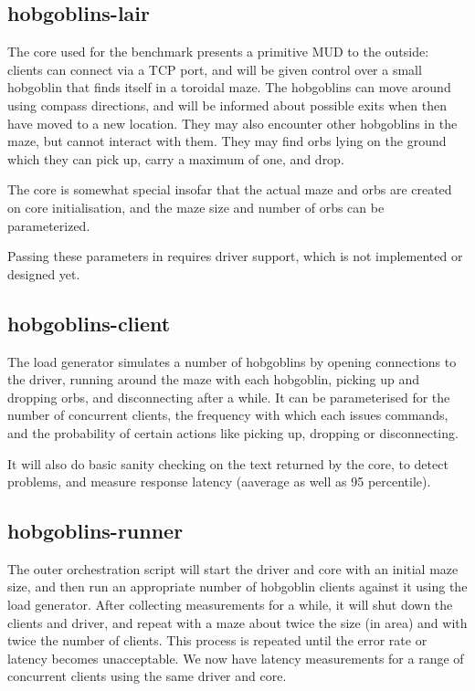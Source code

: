 \documentclass[12pt,a4paper]{article}
\begin{document}
\subsection{hobgoblins-lair}\label{sec:hg_lair}

The core used for the benchmark presents a primitive MUD to the outside: clients
can connect via a TCP port, and will be given control over a small hobgoblin
that finds itself in a toroidal maze. The hobgoblins can move around using
compass directions, and will be informed about possible exits when then have
moved to a new location. They may also encounter other hobgoblins in the maze,
but cannot interact with them. They may find orbs lying on the ground which they
can pick up, carry a maximum of one, and drop. 

The core is somewhat special insofar that the actual maze and orbs are created
on core initialisation, and the maze size and number of orbs can be parameterized. 

\begin{notes}
\item Passing these parameters in requires driver support, which is not
implemented or designed yet.
\end{notes}

\subsection{hobgoblins-client}\label{sec:hg_client}

The load generator simulates a number of hobgoblins by opening connections to
the driver, running around the maze with each hobgoblin, picking up and dropping
orbs, and disconnecting after a while. It can be parameterised for the number of
concurrent clients, the frequency with which each issues commands, and the
probability of certain actions like picking up, dropping or disconnecting.

It will also do basic sanity checking on the text returned by the core, to
detect problems, and measure response latency (aaverage as well as 95
percentile).

\subsection{hobgoblins-runner}\label{sec:hg_runner}

The outer orchestration script will start the driver and core with an initial
maze size, and then run an appropriate number of hobgoblin clients against it
using the load generator. After collecting measurements for a while, it will
shut down the clients and driver, and repeat with a maze about twice the size
(in area) and with twice the number of clients. This process is repeated until
the error rate or latency becomes unacceptable. We now have latency measurements
for a range of concurrent clients using the same driver and core.
\end{document}
